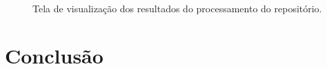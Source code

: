 \documentclass[12pt]{article}
\begin{document}
\pagebreak

    \begin{figure}[ht]
      \centering
      \caption{Tela de visualização dos resultados do processamento do repositório.}
      \label{fig:choose-metric}
    \end{figure}

\section{Conclusão}

\newpage


\end{document}
